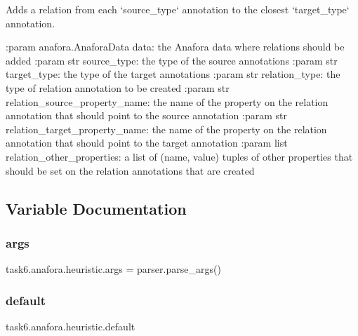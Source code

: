 \begin{DoxyVerb}Adds a relation from each `source_type` annotation to the closest `target_type` annotation.

:param anafora.AnaforaData data: the Anafora data where relations should be added
:param str source_type: the type of the source annotations
:param str target_type: the type of the target annotations
:param str relation_type: the type of relation annotation to be created
:param str relation_source_property_name: the name of the property on the relation annotation that should point to
    the source annotation
:param str relation_target_property_name: the name of the property on the relation annotation that should point to
    the target annotation
:param list relation_other_properties: a list of (name, value) tuples of other properties that should be set on the
    relation annotations that are created
\end{DoxyVerb}
 

\subsection{Variable Documentation}
\mbox{\label{namespacetask6_1_1anafora_1_1heuristic_a8b29eeab29d66e234877fd19b8402e2e}} 
\subsubsection{\texorpdfstring{args}{args}}
{\footnotesize\ttfamily task6.\+anafora.\+heuristic.\+args = parser.\+parse\+\_\+args()}

\mbox{\label{namespacetask6_1_1anafora_1_1heuristic_a562208344b3e47eaf9d95b2f434ef92e}} 
\subsubsection{\texorpdfstring{default}{default}}
{\footnotesize\ttfamily task6.\+anafora.\+heuristic.\+default}

\mbox{\label{namespacetask6_1_1anafora_1_1heuristic_a381bbe904bbbaafb97b55654fd27db40}} 
